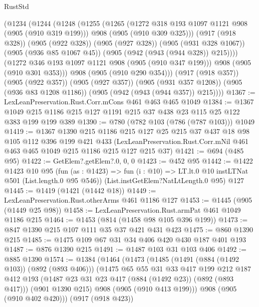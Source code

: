 \begin{lexlean}{RustStd}
\begin{coremodule}
{\begin{coremodule}
{{{{{        (@1234
          (@1244
            (@1248
              (@1255
                (@1265
                  (@1272 @318 @193 @1097 @1121 @908 (@905 (@910 @319 @199)))
                  @908
                  (@905 (@910 @309 @325)))
                (@917 (@918 @328))
                (@905 (@922 @328))
                (@905 (@927 @328))
                (@905 (@931 @328 @1067))
                (@905 (@936 @85 @1067 @45))
                (@905 (@942 (@943 (@944 @328)) @215))))
            (@1272 @346 @193 @1097 @1121 @908 (@905 (@910 @347 @199)))
            @908
            (@905 (@910 @301 @353)))
          @908
          (@905 (@910 @290 @354)))
        (@917 (@918 @357))
        (@905 (@922 @357))
        (@905 (@927 @357))
        (@905 (@931 @357 @1208))
        (@905 (@936 @83 @1208 @1186))
        (@905 (@942 (@943 (@944 @357)) @215))))
@1367 := LexLeanPreservation.Rust.Corr.mCons @461 @463 @465 @1049
@1384 := @1367 @1049 @215 @1186 @215 @127 @1191 @215 @37 @438 @23 @115 @25 @122 @383 @199 @199 @389
@1390 := @780 (@782 @103 (@786 (@787 @103))) @1049
@1419 := @1367
    @1390
    @215
    @1186
    @215
    @127
    @25
    @215
    @37
    @437
    @18
    @98
    @105
    @112
    @396
    @199
    @421
    @433
    (LexLeanPreservation.Rust.Corr.mNil @461 @463 @465 @1049 @215 @1186 @215 @127 @215 @37)
@1421 := @694 (@485 @95)
@1422 := GetElem?.getElem?.{0, 0, 0}
@1423 := @452 @95
@1442 := @1422
    @1423
    @10
    @95
    (fun (as : @1423) => fun (i : @10) => LT.lt.{0} @10 instLTNat @501 (List.length.{0} @95 @546))
    (List.instGetElem?NatLtLength.{0} @95)
    @127
@1445 := @1419 (@1421 (@1442 @18))
@1449 := LexLeanPreservation.Rust.otherArms @461 @1186 @127
@1453 := @1445 (@905 (@1449 @25 @98))
@1458 := LexLeanPreservation.Rust.armPat @461 @1049 @1186 @215
@1464 := @1453 (@814 (@1458 @98 @105 @396 @199))
@1473 := @847 @1390 @215 @107 @111 @35 @37 @421 @431 @423
@1475 := @860 @1390 @215
@1485 := @1475 @109 @67 @31 @34 @406 @420 @430 @187 @401 @193
@1487 := @876 @1390 @215
@1491 := @1487 @103 @31 @103 @406
@1492 := @885 @1390
@1574 := @1384
    (@1464
      (@1473
        (@1485
          (@1491 (@884 (@1492 @103)) (@892 (@893 @406)))
          (@1475
            @65
            @55
            @31
            @33
            @417
            @199
            @212
            @187
            @412
            @193
            (@1487 @23 @31 @23 @417 (@884 (@1492 @23)) (@892 (@893 @417)))
            (@901 @1390 @215)
            @908
            (@905 (@910 @413 @199)))
          @908
          (@905 (@910 @402 @420)))
        (@917 (@918 @423))
}}}}}
\end{coremodule}}
\end{coremodule}
\end{lexlean}

